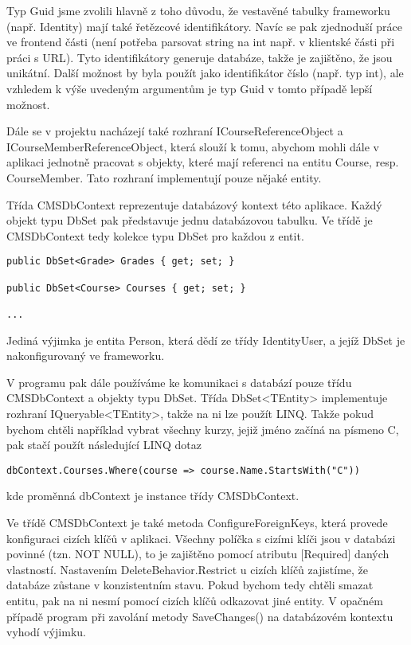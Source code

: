 Typ Guid jsme zvolili hlavně z toho důvodu, že vestavěné tabulky frameworku (např. Identity) mají také řetězcové identifikátory. Navíc se pak zjednoduší práce ve frontend části (není potřeba parsovat string na int např. v klientské části při práci s URL). Tyto identifikátory generuje databáze, takže je zajištěno, že jsou unikátní.
Další možnost by byla použít jako identifikátor číslo (např. typ int), ale vzhledem k výše uvedeným argumentům je typ Guid v tomto případě lepší možnost.

Dále se v projektu nacházejí také rozhraní ICourseReferenceObject a ICourseMemberReferenceObject, která slouží k tomu, abychom mohli dále v aplikaci jednotně pracovat s objekty, které mají referenci na entitu Course, resp. CourseMember. Tato rozhraní implementují pouze nějaké entity.

Třída CMSDbContext reprezentuje databázový kontext této aplikace. Každý objekt typu DbSet pak představuje jednu databázovou tabulku. Ve třídě je CMSDbContext tedy kolekce typu DbSet pro každou z entit.

\begin{lstlisting}
public DbSet<Grade> Grades { get; set; }

public DbSet<Course> Courses { get; set; }

...
\end{lstlisting}

Jediná výjimka je entita Person, která dědí ze třídy IdentityUser, a jejíž DbSet je nakonfigurovaný ve frameworku. 

V programu pak dále používáme ke komunikaci s databází pouze třídu CMSDbContext a objekty typu DbSet. Třída DbSet<TEntity> implementuje rozhraní IQueryable<TEntity>, takže na ni lze použít LINQ. Takže pokud bychom chtěli například vybrat všechny kurzy, jejiž jméno začíná na písmeno C, pak stačí použít následující LINQ dotaz
\begin{lstlisting}
dbContext.Courses.Where(course => course.Name.StartsWith("C"))
\end{lstlisting}
kde proměnná dbContext je instance třídy CMSDbContext.

Ve třídě CMSDbContext je také metoda ConfigureForeignKeys, která provede konfiguraci cizích klíčů v aplikaci. Všechny políčka s cizími klíči jsou v databázi povinné (tzn. NOT NULL), to je zajištěno pomocí atributu [Required] daných vlastností. Nastavením DeleteBehavior.Restrict u cizích klíčů zajistíme, že databáze zůstane v konzistentním stavu. Pokud bychom tedy chtěli smazat entitu, pak na ni nesmí pomocí cizích klíčů odkazovat jiné entity. V opačném případě program při zavolání metody SaveChanges() na databázovém kontextu vyhodí výjimku.

